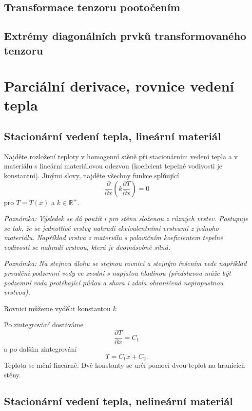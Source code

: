 \konec



\subsection{Transformace tenzoru pootočením}

\subsection{Extrémy diagonálních prvků transformovaného tenzoru}



\stranka
\section{Parciální derivace, rovnice vedení tepla}

\stranka
\subsection{Stacionární vedení tepla, lineární materiál}

Najděte rozložení teploty v homogenní stěně při stacionárním vedení tepla a v materiálu s lineární materiálovou odezvou (koeficient tepelné vodivosti je konstantní).
Jinými slovy, najděte všechny funkce splňující
$$\frac{\partial}{\partial x} \left(k \frac{\partial T}{\partial x}\right)=0$$
pro $T=T(x)$ a $k\in \mathbb R^+$.

\textit{Poznámka: Výsledek se dá použít i pro stěnu složenou z různých vrstev. Postupuje se tak, že se jednotlivé vrstvy nahradí ekvivalentními vrstvami z jednoho materiálu. Například vrstva z materiálu s polovičním koeficientem tepelné vodivosti se nahradí vrstvou, která je dvojnásobně silná.}

\textit{Poznámka: Na stejnou úlohu se stejnou rovnicí a stejným řešením vede například proudění podzemní vody ve zvodni s napjatou hladinou (představou může být podzemní voda protékající půdou a shora i zdola ohraničená nepropustnou vrstvou).}

\reseni

Rovnici můžeme vydělit konstantou $k$

Po zintegrování dostáváme $$ \frac{\partial T}{\partial x}=C_1$$
a po dalším zintegrování $$T=C_1x+C_2.$$ Teplota se mění lineárně. Dvě konstanty se určí pomocí dvou teplot na hranicích stěny.

\konec

\stranka
\subsection{Stacionární vedení tepla, nelineární materiál}


